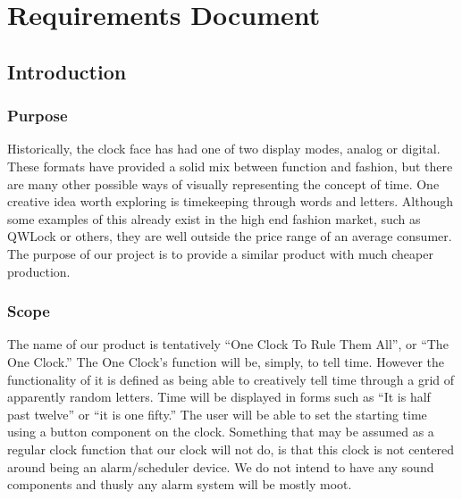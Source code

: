 \documentclass[onecolumn, draftclsnofoot,10pt, compsoc]{IEEEtran}
\begin{document}
\section{Requirements Document}
\subsection{Introduction}
\subsubsection{Purpose}
Historically, the clock face has had one of two display modes, analog or digital.
These formats have provided a solid mix between function and fashion, but there are many
other possible ways of visually representing the concept of time. One creative idea worth
exploring is timekeeping through words and letters. Although some examples of this already
exist in the high end fashion market, such as QWLock or others, they are well outside the
price range of an average consumer. The purpose of our project is to provide a similar
product with much cheaper production.

\subsubsection{Scope}
The name of our product is tentatively “One Clock To Rule Them All”, or “The One Clock.”
The One Clock’s function will be, simply, to tell time. However the functionality of it is
defined as being able to creatively tell time through a grid of apparently random letters.
Time will be displayed in forms such as “It is half past twelve” or “it is one fifty.” The
user will be able to set the starting time using a button component on the clock. Something
that may be assumed as a regular clock function that our clock will not do, is that this clock
 is not centered around being an alarm/scheduler device. We do not intend to have any sound
 components and thusly any alarm system will be mostly moot.
\end{document}
